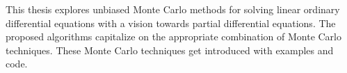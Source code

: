 This thesis explores unbiased Monte Carlo
methods for solving linear
ordinary differential equations with a vision towards
partial differential equations.
The proposed algorithms capitalize on the appropriate
combination of Monte Carlo techniques.
These Monte Carlo techniques get introduced with examples
and code.
